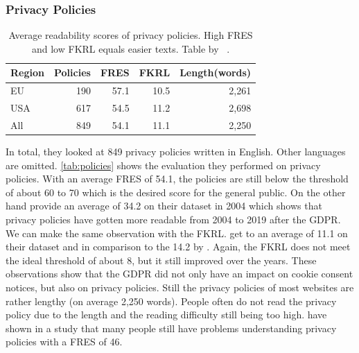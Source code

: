 \subsubsection{Privacy Policies}
\label{subsub:priv}

\begin{table}
    \begin{tabular}{ l r r r r }
        \hline
        Region & Policies & FRES & FKRL & Length(words) \\
        \hline
        EU & 190 & 57.1 & 10.5 & 2,261 \\
        USA & 617 & 54.5 & 11.2 & 2,698 \\
        All & 849 & 54.1 & 11.1 & 2,250 \\
        \hline
    \end{tabular}
    \caption{Average readability scores of privacy policies. High FRES and low FKRL equals easier texts. Table by
    \citeauthor{sanchez2019can}~\cite[Tab.~5]{sanchez2019can}.}
    \label{tab:policies}
\end{table}

In total, they looked at 849 privacy policies written in English. Other languages are omitted.
\autoref{tab:policies} shows the evaluation they performed on privacy policies. With an average FRES of 54.1, the
policies are still below the threshold of about 60 to 70 which is the desired score for the general public. On the
other hand  provide an average of 34.2 on their dataset in 2004 which shows that privacy policies
have gotten more readable from 2004 to 2019 after the GDPR. We can make the same observation with the FKRL. \citeauthor{sanchez2019can} get to an average
of 11.1 on their dataset and in comparison to the 14.2 by . Again, the FKRL does not meet the
ideal threshold of about 8, but it still improved over the years. These observations show that the GDPR did not only have
an impact on cookie consent notices, but also on privacy policies. Still the privacy policies of most websites are
rather lengthy (on average 2,250 words). People often do not read the privacy policy due to the length and the
reading difficulty still being too high.  have shown in a study that many people still have
problems understanding privacy policies with a FRES of 46.

